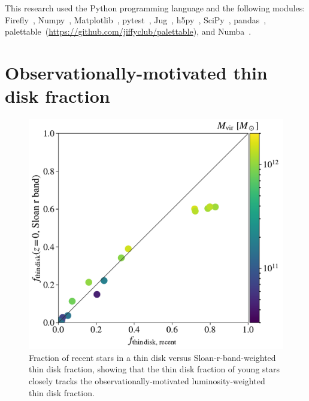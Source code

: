 \documentclass[fleqn,usenatbib]{mnras}
\begin{document}
This research used the Python programming language and the following modules:
Firefly~\citep{Geller2018},
Numpy~\citep{Harris2020},
Matplotlib~\citep{Hunter2007},
pytest~\citep{pytest3.4},
Jug~\citep{Coelho2017},
h5py~\citep{h5py},
SciPy~\citep{Virtanen2020},
pandas~\citep{McKinney2010,Reback2020},
palettable~(\url{https://github.com/jiffyclub/palettable}),
and Numba~\citep{Lam2015}.








\appendix

\section{Observationally-motivated thin disk fraction}
\label{s: appendix-sloan thin disk fraction}

\begin{figure}
    \centering
    \includegraphics[width=\columnwidth]{figures/prevalence/thin_disk_frac_sloanr_v_thin_disk_frac_recent.pdf}
    \caption{
    Fraction of recent stars in a thin disk versus Sloan-r-band-weighted thin disk fraction, showing that the thin disk fraction of young stars closely tracks the observationally-motivated luminosity-weighted thin disk fraction.
    }
    \label{f: thin disk v thin disk}
\end{figure}
\end{document}
